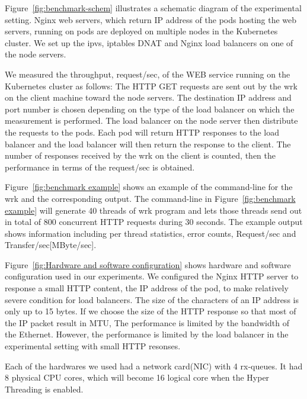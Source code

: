 Figure~\ref{fig:benchmark-schem} illustrates a schematic diagram of the experimental setting.
Nginx web servers, which return IP address of the pods hosting the web servers, 
running on pods are deployed on multiple nodes in the Kubernetes cluster. 
We set up the ipvs, iptables DNAT and Nginx load balancers on one of the node servers. 

We measured the throughput, request/sec, of the WEB service running on the Kubernetes cluster as follows:
The HTTP GET requests are sent out by the wrk on the client machine toward the node servers.
The destination IP address and port number is chosen 
depending on the type of the load balancer on which the measurement is performed.
The load balancer on the node server then distribute the requests to the pods.
Each pod will return HTTP responses to the load balancer and the load balancer will then 
return the response to the client.
The number of responses received by the wrk on the client is counted, 
then the performance in terms of the request/sec is obtained. 

Figure~\ref{fig:benchmark example} shows an example of the command-line for the wrk and the corresponding output.
The command-line in Figure~\ref{fig:benchmark example} will generate 40 threads of wrk program 
and lets those threads send out in total of 800 concurrent HTTP requests during 30 seconds.
The example output shows information including per thread statistics, error counts, Request/sec and Transfer/sec[MByte/sec].

Figure~\ref{fig:Hardware and software configuration} shows hardware and software configuration used in our experiments.
We configured the Nginx HTTP server to response a small HTTP content, 
the IP address of the pod, to make relatively severe condition for load balancers. 
The size of the characters of an IP address is only up to 15 bytes.
If we choose the size of the HTTP response so that most of the IP packet result in MTU,
The performance is limited by the bandwidth of the Ethernet. 
However, the performance is limited by the load balancer in the experimental setting with small HTTP resonses.

Each of the hardwares we used had a network card(NIC) with 4 rx-queues.
It had 8 physical CPU cores, which will become 16 logical core when the Hyper Threading is enabled.

